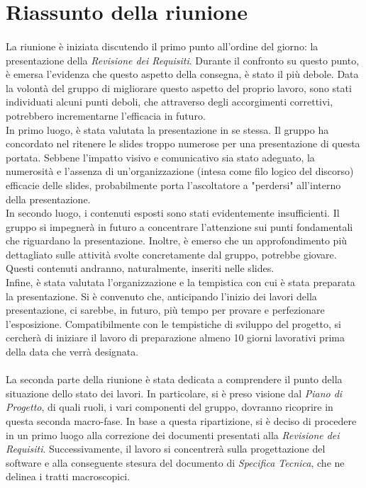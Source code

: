 \section{Riassunto della riunione}
\label{riassunto}
\paragraph{}
La riunione è iniziata discutendo il primo punto all'ordine del giorno: la presentazione della \textit{Revisione dei Requisiti}. Durante il confronto su questo punto, è emersa l'evidenza che questo aspetto della consegna, è stato il più debole. Data la volontà del gruppo di migliorare questo aspetto del proprio lavoro, sono stati individuati alcuni punti deboli, che attraverso degli accorgimenti correttivi, potrebbero incrementarne l'efficacia in futuro.\\
In primo luogo, è stata valutata la presentazione in se stessa. Il gruppo ha concordato nel ritenere le slides troppo numerose per una presentazione di questa portata. Sebbene l'impatto visivo e comunicativo sia stato adeguato, la numerosità e l'assenza di un'organizzazione (intesa come filo logico del discorso) efficacie delle slides, probabilmente porta l'ascoltatore a "perdersi" all'interno della presentazione.\\
In secondo luogo, i contenuti esposti sono stati evidentemente insufficienti. Il gruppo si impegnerà in futuro a concentrare l'attenzione sui punti fondamentali che riguardano la presentazione. Inoltre, è emerso che un approfondimento più dettagliato sulle attività svolte concretamente dal gruppo, potrebbe giovare. Questi contenuti andranno, naturalmente, inseriti nelle slides.\\
Infine, è stata valutata l'organizzazione e la tempistica con cui è stata preparata la presentazione. Si è convenuto che, anticipando l'inizio dei lavori della presentazione, ci sarebbe, in futuro, più tempo per provare e perfezionare l'esposizione. Compatibilmente con le tempistiche di sviluppo del progetto, si cercherà di iniziare il lavoro di preparazione almeno 10 giorni lavorativi prima della data che verrà designata.

\paragraph{}
La seconda parte della riunione è stata dedicata a comprendere il punto della situazione dello stato dei lavori. In particolare, si è preso visione dal \textit{Piano di Progetto}, di quali ruoli, i vari componenti del gruppo, dovranno ricoprire in questa seconda macro-fase. In base a questa ripartizione, si è deciso di procedere in un primo luogo alla correzione dei documenti presentati alla \textit{Revisione dei Requisiti}. Successivamente, il lavoro si concentrerà sulla progettazione del software e alla conseguente stesura del documento di \textit{Specifica Tecnica}, che ne delinea i tratti macroscopici.